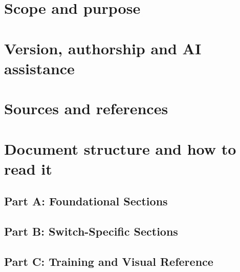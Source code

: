 \documentclass[11pt, a4paper, twoside]{report}
\begin{document}
\section{Scope and purpose}
\label{sec:C1-S2}


\section{Version, authorship and AI assistance}
\label{sec:C1-S3}

\section{Sources and references}
\label{sec:C1-S4}

\section{Document structure and how to read it}
\label{sec:C1-S5}

\subsection{Part A: Foundational Sections}
\label{sec:C1-S5-S1}

\subsection{Part B: Switch-Specific Sections}
\label{sec:C1-S5-S2}

\subsection{Part C: Training and Visual Reference}
\label{sec:C1-S5-S3}
\end{document}

